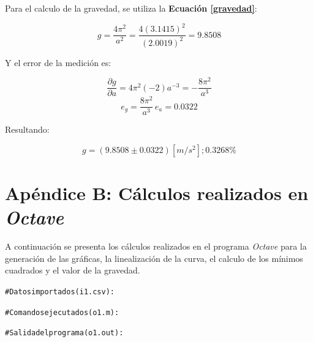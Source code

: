 \documentclass[letter,11pt]{article}
\begin{document}
Para el calculo de la gravedad, se utiliza la \textbf{Ecuación \ref{gravedad}}:

\begin{equation*}
    g = \frac{4 \pi^2}{a^2} = \frac{4(3.1415)^2}{(2.0019)^2} = 9.8508
\end{equation*}
\vspace{0.10cm}

Y el error de la medición es:

\begin{equation*}
    \frac{\partial g}{\partial a} = 4 \pi^2 (-2) a^{-3} = -\frac{8\pi^2}{a^3}
\end{equation*}
\begin{equation*}
    e_g = \frac{8 \pi^2}{a^3}\,e_a = 0.0322
\end{equation*}
\vspace{0.10cm}

Resultando:

\begin{equation*}
    g = (9.8508 \pm 0.0322) [m/s^2]; 0.3268\%
\end{equation*}
\vspace{0.10cm}

\newpage
\section*{Apéndice B: Cálculos realizados en \emph{Octave}}

A continuación se presenta los cálculos realizados en el programa \emph{Octave}
para la generación de las gráficas, la linealización de la curva, el calculo
de los mínimos cuadrados y el valor de la gravedad.

\begin{shaded}
\begin{alltt}
\footnotesize
\# Datos importados (i1.csv):

\# Comandos ejecutados (o1.m):



\# Salida del programa (o1.out):

\normalsize
\end{alltt}
\end{shaded}
\end{document}
